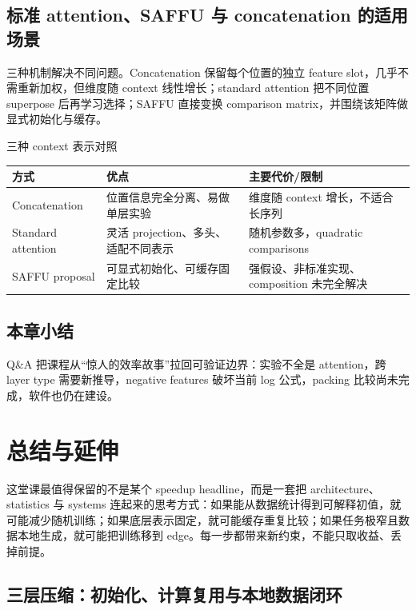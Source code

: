 \documentclass[a4paper]{article}
\begin{document}

\subsection{标准 attention、SAFFU 与 concatenation 的适用场景}

三种机制解决不同问题。Concatenation 保留每个位置的独立 feature slot，几乎不需重新加权，但维度随 context 线性增长；standard attention 把不同位置 superpose 后再学习选择；SAFFU 直接变换 comparison matrix，并围绕该矩阵做显式初始化与缓存。

\begin{knowledgebox}{三种 context 表示对照}
\begin{tabularx}{\textwidth}{L{0.19\textwidth} L{0.25\textwidth} X}
\toprule
方式 & 优点 & 主要代价/限制 \\
\midrule
Concatenation & 位置信息完全分离、易做单层实验 & 维度随 context 增长，不适合长序列 \\
Standard attention & 灵活 projection、多头、适配不同表示 & 随机参数多，quadratic comparisons \\
SAFFU proposal & 可显式初始化、可缓存固定比较 & 强假设、非标准实现、composition 未完全解决 \\
\bottomrule
\end{tabularx}
\end{knowledgebox}

\subsection{本章小结}

Q\&A 把课程从“惊人的效率故事”拉回可验证边界：实验不全是 attention，跨 layer type 需要新推导，negative features 破坏当前 log 公式，packing 比较尚未完成，软件也仍在建设。

\section{总结与延伸}

这堂课最值得保留的不是某个 speedup headline，而是一套把 architecture、statistics 与 systems 连起来的思考方式：如果能从数据统计得到可解释初值，就可能减少随机训练；如果底层表示固定，就可能缓存重复比较；如果任务极窄且数据本地生成，就可能把训练移到 edge。每一步都带来新约束，不能只取收益、丢掉前提。

\subsection{三层压缩：初始化、计算复用与本地数据闭环}
\end{document}
